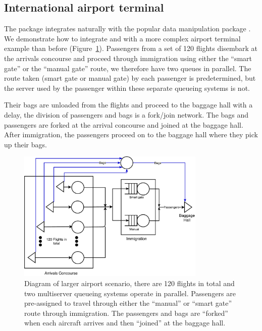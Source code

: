 \documentclass[article]{jss}
\begin{document}
\subsection{International airport terminal} \label{ssec:largerairport}

The package integrates naturally with the popular data manipulation
 package  \citep{Rpkg_dplyr}. We demonstrate
how to integrate  and  with a more
complex airport terminal example than before
(Figure~\ref{fig:larger_airport}). Passengers from a set of 120
flights disembark at the arrivals concourse and proceed through
immigration using either the ``smart gate'' or the ``manual gate''
route, we therefore have two queues in parallel. The route taken
(smart gate or manual gate) by each passenger is predetermined, but
the server used by the passenger within these separate queueing
systems is not.

Their bags are unloaded from the flights and proceed to the baggage
hall with a delay, the division of passengers and bags is a
fork/join network. The bags and passengers are forked at the arrival
concourse and joined at the baggage hall. After immigration, the
passengers proceed on to the baggage hall where they pick up their
bags.

\begin{figure}[t!]
\centering
\includegraphics[width = 0.8\textwidth]{Larger_airport.pdf}
\caption{Diagram of larger airport scenario, there are 120 flights in
  total and two multiserver queueing systems operate in
  parallel. Passengers are pre-assigned to travel through either the
  ``manual'' or ``smart gate'' route through immigration. The
  passengers and bags are ``forked'' when each aircraft arrives and
  then ``joined'' at the baggage hall. }
\label{fig:larger_airport}
\end{figure}
\end{document}
